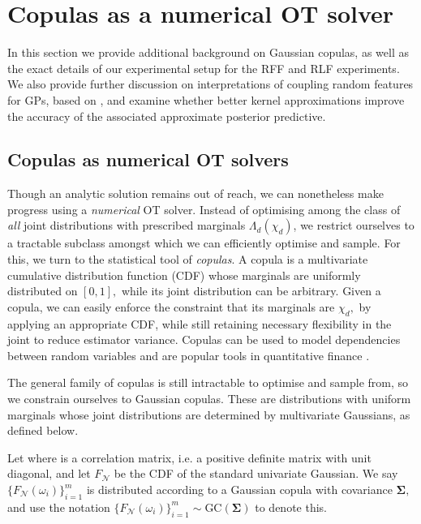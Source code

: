 \section{Copulas as a numerical OT solver}
\label{app:copulas}

In this section we provide additional background on Gaussian copulas, as well as the exact details of our experimental setup for the RFF and RLF experiments.
We also provide further discussion on interpretations of coupling random features for GPs, based on \citep{lazaro2010sparse}, and examine whether better kernel approximations improve the accuracy of the associated approximate posterior predictive.

\subsection{Copulas as numerical OT solvers}

Though an analytic solution remains out of reach, we can nonetheless make progress using a \emph{numerical} OT solver. 
Instead of optimising among the class of \emph{all} joint distributions with prescribed marginals $\Lambda_d(\chi_d)$, we restrict ourselves to a tractable subclass amongst which we can efficiently optimise and sample.
For this, we turn to the statistical tool of \emph{copulas}.
A copula is a multivariate cumulative distribution function (CDF) whose marginals are uniformly distributed on $[0, 1],$ while its joint distribution can be arbitrary.
Given a copula, we can easily enforce the constraint that its marginals are $\chi_d,$ by applying an appropriate CDF, while still retaining necessary flexibility in the joint to reduce estimator variance.
Copulas can be used to model dependencies between random variables and are popular tools in quantitative finance \citep{nelsen2006introduction,haugh2016introduction}.

The general family of copulas is still intractable to optimise and sample from, so we constrain ourselves to Gaussian copulas.
These are distributions with uniform marginals whose joint distributions are determined by multivariate Gaussians, as defined below.

\begin{definition}
    Let  where  is a correlation matrix, i.e. a positive definite matrix with unit diagonal, and let $F_{\mathcal{N}}$ be the CDF of the standard univariate Gaussian.
    We say $\{F_\mathcal{N}(\omega_i)\}_{i = 1}^m$ is distributed according to a Gaussian copula with covariance $\boldsymbol{\Sigma},$ and use the notation $\{F_\mathcal{N}(\omega_i)\}_{i = 1}^m \sim \text{GC}(\boldsymbol{\Sigma})$ to denote this.
\end{definition}

